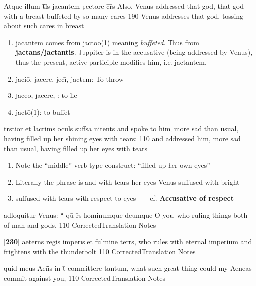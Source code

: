 \latline
  {Atque illum t\={}l\={\macron {\i}}s jacantem pectore c\={}r\={}s}
  { Also, Venus addressed that god, that god with a breast buffeted by so many cares }
  {190}
  { Venus addresses that god, tossing about such cares in breast  }
  { \begin{enumerate}
  	\item jacantem comes from jacto\={o}(1) meaning \emph{buffeted}. Thus from
    \textbf{jact\={a}ns/jactantis}. Juppiter is in the accusative (being
    addressed by Venus), thus the present, active participle modifies him,
    i.e. jactantem.
    \item jaci\={o}, jacere, jec\={\i}, jactum:  To throw
    \item jace\={o}, jac\={e}re, : to lie
    \item jact\={o}(1):  to buffet
  \end{enumerate} }


\latline
  {tr\={\macron {\i}}stior et lacrim\={\macron {\i}}s ocul\={}s suff\={}sa nitent\={\macron {\i}}s}
  { and spoke to him, more sad than usual, having filled up her shining eyes with tears: }
  {110}
  { and addressed him, more sad than usual, having filled up her eyes with tears }
  { \begin{enumerate}
  	\item Note the ``middle'' verb type construct:  ``filled up her own eyes''
  	\item Literally the phrase is and with tears her eyes Venus-suffused with bright
  	\item suffused with tears with respect to eyes ––- cf. \textbf{Accusative of respect}
  \end{enumerate} }


\latline
  {adloquitur Venus: ``\={} qu\={\macron {\i}} r\={}s hominumque deumque}
  { O you, who ruling things both of man and gods, }
  {110}
  { CorrectedTranslation }
  { Notes }


\latline
  {[\textbf{230}] aetern\={\macron {\i}}s regis imperi\={\macron {\i}}s et fulmine terr\={}s,}
  { who rules with eternal imperium and frightens with the thunderbolt }
  {110}
  { CorrectedTranslation }
  { Notes }


\latline
  {quid meus Aen\={}\={}s in t\={} committere tantum,}
  { what such great thing could my Aeneas commit against you, }
  {110}
  { CorrectedTranslation }
  { Notes }


